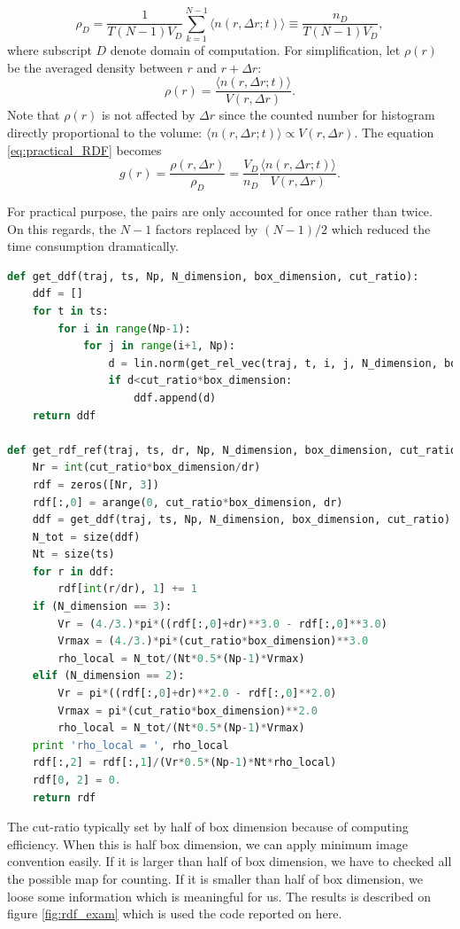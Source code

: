 \documentclass[10pt, a4paper]{article}
\begin{document}
\begin{appendices}
\begin{equation}
    \rho_{D} = \frac{1}{T(N-1)V_D}\sum_{k=1}^{N-1}\langle n(r, \Delta r;t)\rangle \equiv \frac{n_D}{T(N-1)V_D},
  \end{equation}
  where subscript $D$ denote domain of computation. 
  For simplification, let $\rho(r)$ be the averaged density between $r$ and $r+\Delta r$:
  \begin{equation}
    \rho(r) = \frac{\langle n(r, \Delta r; t)\rangle}{V(r, \Delta r)}. %
  \end{equation}
  Note that $\rho(r)$ is not affected by $\Delta r$ since the counted number for histogram directly proportional to the volume: $\langle n(r, \Delta r; t)\rangle \propto V(r, \Delta r)$.
  The equation \eqref{eq:practical_RDF} becomes
  \begin{equation}
    g(r) = \frac{\rho(r, \Delta r)}{\rho_D} = \frac{V_D}{n_D}\frac{\langle n(r, \Delta r; t)\rangle}{V(r, \Delta r)}. \label{eq:practical_RDF_refine}
  \end{equation}

  

  For practical purpose, the pairs are only accounted for once rather than twice. On this regards, the $N-1$ factors replaced by $(N-1)/2$ which reduced the time consumption dramatically. 
  \begin{lstlisting}[language=Python,frame=single]
def get_ddf(traj, ts, Np, N_dimension, box_dimension, cut_ratio):
    ddf = []
    for t in ts:
        for i in range(Np-1):
            for j in range(i+1, Np):
                d = lin.norm(get_rel_vec(traj, t, i, j, N_dimension, box_dimension))
                if d<cut_ratio*box_dimension:
                    ddf.append(d)
    return ddf

def get_rdf_ref(traj, ts, dr, Np, N_dimension, box_dimension, cut_ratio):
    Nr = int(cut_ratio*box_dimension/dr)
    rdf = zeros([Nr, 3])
    rdf[:,0] = arange(0, cut_ratio*box_dimension, dr)
    ddf = get_ddf(traj, ts, Np, N_dimension, box_dimension, cut_ratio)
    N_tot = size(ddf)
    Nt = size(ts)
    for r in ddf:
        rdf[int(r/dr), 1] += 1
    if (N_dimension == 3):
        Vr = (4./3.)*pi*((rdf[:,0]+dr)**3.0 - rdf[:,0]**3.0)
        Vrmax = (4./3.)*pi*(cut_ratio*box_dimension)**3.0
        rho_local = N_tot/(Nt*0.5*(Np-1)*Vrmax)
    elif (N_dimension == 2):
        Vr = pi*((rdf[:,0]+dr)**2.0 - rdf[:,0]**2.0)
        Vrmax = pi*(cut_ratio*box_dimension)**2.0
        rho_local = N_tot/(Nt*0.5*(Np-1)*Vrmax)
    print 'rho_local = ', rho_local
    rdf[:,2] = rdf[:,1]/(Vr*0.5*(Np-1)*Nt*rho_local)
    rdf[0, 2] = 0. 
    return rdf
    \end{lstlisting}
    The cut-ratio typically set by half of box dimension because of computing efficiency. When this is half box dimension, we can apply minimum image convention easily. If it is larger than half of box dimension, we have to checked all the possible map for counting. If it is smaller than half of box dimension, we loose some information which is meaningful for us. 
    The results is described on figure \ref{fig:rdf_exam} which is used the code reported on here. 



\end{appendices}
\end{document}
